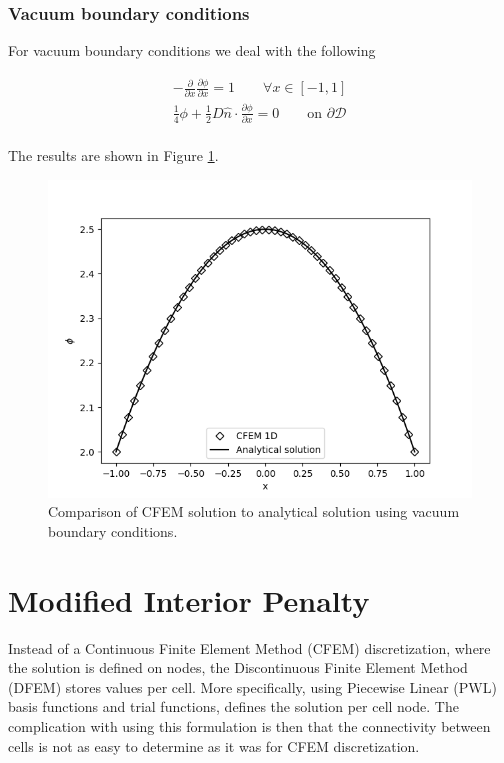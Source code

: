 \documentclass[11pt,letterpaper,titlepage]{article}
\newcommand{\bOmega}{\mathcal{D}}
\numberwithin{equation}{section}
\begin{document}
\subsubsection{Vacuum boundary conditions}
For vacuum boundary conditions we deal with the following

\begin{equation*}
\begin{aligned}
-\frac{\partial}{\partial x} \frac{\partial \phi}{\partial x} = 1 \quad \quad \forall x \in [-1,1] \\
\frac{1}{4}\phi + \frac{1}{2}D \hat{n} \cdot \frac{\partial \phi}{\partial x} = 0 \quad \quad \text{on } \partial \bOmega \\
\end{aligned}
\end{equation*}

The results are shown in Figure \ref{fig:Diffusion1c}.

\begin{figure}[H]
\centering
\includegraphics[width=0.8\linewidth]{Figures/Diffusion1c}
\caption{Comparison of CFEM solution to analytical solution using vacuum boundary conditions.}
\label{fig:Diffusion1c}
\end{figure}

\newpage
\section{Modified Interior Penalty}
Instead of a Continuous Finite Element Method (CFEM) discretization, 
where the solution is defined on nodes, the Discontinuous Finite Element
Method (DFEM) stores values per cell. More specifically, using Piecewise
Linear (PWL) basis functions and trial functions, defines the solution per cell 
node. The complication with using this formulation is then that the 
connectivity between cells is not as easy to determine as it was for 
CFEM discretization.
\end{document}

